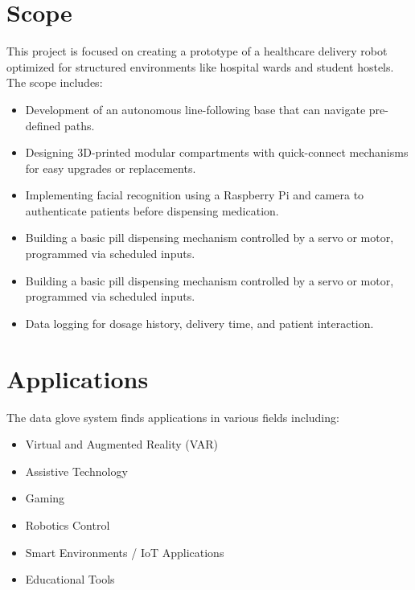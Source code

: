 \section{Scope}
This project is focused on creating a prototype of a healthcare delivery robot optimized for structured environments like hospital wards and student hostels. The scope includes:
\begin{itemize}
    \item Development of an autonomous line-following base that can navigate pre-defined paths.
    \item Designing 3D-printed modular compartments with quick-connect mechanisms for easy upgrades or replacements.
    \item Implementing facial recognition using a Raspberry Pi and camera to authenticate patients before dispensing medication.
    \item Building a basic pill dispensing mechanism controlled by a servo or motor, programmed via scheduled inputs.
    \item Building a basic pill dispensing mechanism controlled by a servo or motor, programmed via scheduled inputs.
    \item Data logging for dosage history, delivery time, and patient interaction.
\end{itemize}
\vspace{1.5\baselineskip}
\section{Applications}
The data glove system finds applications in various fields including:
\begin{itemize}
    \item Virtual and Augmented Reality (VAR)
    \item Assistive Technology
    \item Gaming
    \item Robotics Control
    \item Smart Environments / IoT Applications
    \item Educational Tools
\end{itemize}


